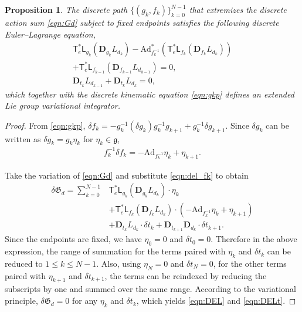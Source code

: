 \documentclass[letterpaper, 10pt, conference]{ieeeconf}
\newcommand{\T}{\ensuremath{\mathsf{T}}}
\renewcommand{\L}{\ensuremath{\mathsf{L}}}
\newcommand{\D}{\ensuremath{\mathbf{D}}}
\newcommand{\Ad}{\ensuremath{\mathrm{Ad}}}
\newcommand{\g}{\ensuremath{\mathfrak{g}}}
\newtheorem{prop}{Proposition}
\begin{document}
\begin{prop}
    The discrete path $\{(g_k,f_k)\}_{k=0}^{N-1}$ that extremizes the discrete action sum \eqref{eqn:Gd} subject to fixed endpoints satisfies the following discrete Euler--Lagrange equation,
    \begin{gather}
        \T^*_e\L_{g_k}(\D_{g_k} L_{d_k})- \Ad^*_{f_k^{-1}} (\T^*_e\L_{f_k}(\D_{f_k} L_{d_k}))\nonumber \\
        + \T^*_e\L_{f_{k-1}}(\D_{f_{k-1}} L_{d_{k-1}}) =0,\label{eqn:DEL}\\
        \D_{t_k} L_{d_{k-1}} + \D_{t_k} L_{d_k} = 0, \label{eqn:DELt}
    \end{gather}
    which together with the discrete kinematic equation \eqref{eqn:gkp} defines an extended Lie group variational integrator.
\end{prop}
\begin{proof}
    From \eqref{eqn:gkp}, $\delta f_k = - g_k^{-1}( \delta g_k ) g_k^{-1} g_{k+1} + g_k^{-1}\delta g_{k+1}$.
    Since $\delta g_k$ can be written as $\delta g_k = g_k \eta_k $ for $\eta_k\in \g$, 
    \begin{align}
        f_k^{-1}\delta f_k = -\Ad_{f_k^{-1}} \eta_k + \eta_{k+1}.\label{eqn:del_fk}
    \end{align}

    Take the variation of \eqref{eqn:Gd} and substitute \eqref{eqn:del_fk} to obtain
    \begin{align*}
        \delta \mathfrak{G}_d  = \sum_{k=0}^{N-1}
        & \T^*_e\L_{g_k}(\D_{g_k} L_{d_k}) \cdot \eta_k \\
        & + \T^*_e\L_{f_k}(\D_{f_k} L_{d_k}) \cdot (-\Ad_{f_k^{-1}} \eta_k + \eta_{k+1}) \\
        & + \D_{t_k} L_{d_k}\cdot \delta t_k + \D_{t_{k+1}} \D_{d_k}\cdot \delta t_{k+1}.
    \end{align*}
    Since the endpoints are fixed, we have $\eta_0=0$ and $\delta t_0 = 0$.
    Therefore in the above expression, the range of summation for the terms paired with $\eta_k$ and $\delta t_k$ can be reduced to $1\leq k\leq N-1$. 
    Also, using $\eta_N=0$ and $\delta t_N=0$, for the other terms paired with $\eta_{k+1}$ and $\delta t_{k+1}$, the terms can be reindexed by reducing the subscripts by one and summed over the same range.
    According to the variational principle, $\delta\mathfrak{G}_d = 0$ for any $\eta_k$ and $\delta t_k$, which yields \eqref{eqn:DEL} and \eqref{eqn:DELt}.
\end{proof}
\end{document}
